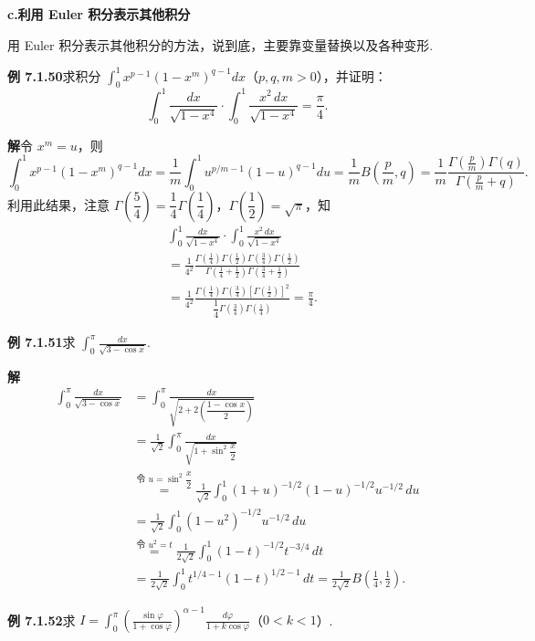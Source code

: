 \documentclass[UTF8,12pt,a4paper,fontset=fandol]{ctexart}
\begin{document}
\noindent\textbf{c.\quad 利用 Euler 积分表示其他积分}

用 Euler 积分表示其他积分的方法，说到底，主要靠变量替换以及各种变形.

\noindent\textbf{例 7.1.50}\quad 求积分 $\displaystyle\int_0^1x^{p-1}(1-x^m)^{q-1}dx$（$p,q,m>0$），并证明：
\[
\int_0^1\frac{dx}{\sqrt{1-x^4}}\cdot\int_0^1\frac{x^2\,dx}{\sqrt{1-x^4}}=\frac\pi4.
\]

\noindent\textbf{解}\quad 令 $x^m=u$，则
\[
\int_0^1x^{p-1}(1-x^m)^{q-1}dx
=\frac1m\int_0^1u^{p/m-1}(1-u)^{q-1}du
=\frac1m B\left(\frac pm,q\right)
=\frac1m\frac{\Gamma\left(\frac pm\right)\Gamma(q)}
{\Gamma\left(\frac pm+q\right)}.
\]
利用此结果，注意 $\Gamma\left(\dfrac54\right)=\dfrac14\Gamma\left(\dfrac14\right)$，$\Gamma\left(\dfrac12\right)=\sqrt\pi$，知
\[
\begin{aligned}
&\int_0^1\frac{dx}{\sqrt{1-x^4}}\cdot\int_0^1\frac{x^2\,dx}{\sqrt{1-x^4}}\\
&=\frac1{4^2}
\frac{\Gamma\left(\frac14\right)\Gamma\left(\frac12\right)
\Gamma\left(\frac34\right)\Gamma\left(\frac12\right)}
{\Gamma\left(\frac14+\frac12\right)\Gamma\left(\frac34+\frac12\right)}\\
&=\frac1{4^2}
\frac{\Gamma\left(\frac14\right)\Gamma\left(\frac34\right)
\left[\Gamma\left(\frac12\right)\right]^2}
{\dfrac14\Gamma\left(\frac34\right)\Gamma\left(\frac14\right)}
=\frac\pi4.
\end{aligned}
\]

\noindent\textbf{例 7.1.51}\quad 求 $\displaystyle\int_0^\pi\frac{dx}{\sqrt{3-\cos x}}$.

\noindent\textbf{解}\quad
\[
\begin{aligned}
\int_0^\pi\frac{dx}{\sqrt{3-\cos x}}
&=\int_0^\pi\frac{dx}{\sqrt{2+2\left(\dfrac{1-\cos x}{2}\right)}}\\
&=\frac1{\sqrt2}\int_0^\pi\frac{dx}{\sqrt{1+\sin^2\dfrac x2}}\\
&\overset{\text{令 }u=\sin^2\dfrac x2}{=}
\frac1{\sqrt2}\int_0^1(1+u)^{-1/2}(1-u)^{-1/2}u^{-1/2}\,du\\
&=\frac1{\sqrt2}\int_0^1(1-u^2)^{-1/2}u^{-1/2}\,du\\
&\overset{\text{令 }u^2=t}{=}
\frac1{2\sqrt2}\int_0^1(1-t)^{-1/2}t^{-3/4}\,dt\\
&=\frac1{2\sqrt2}\int_0^1t^{1/4-1}(1-t)^{1/2-1}\,dt
=\frac1{2\sqrt2}B\left(\frac14,\frac12\right).
\end{aligned}
\]

\noindent\textbf{例 7.1.52}\quad 求 $I=\displaystyle\int_0^\pi\left(\frac{\sin\varphi}{1+\cos\varphi}\right)^{\alpha-1}\frac{d\varphi}{1+k\cos\varphi}$（$0<k<1$）.
\end{document}
